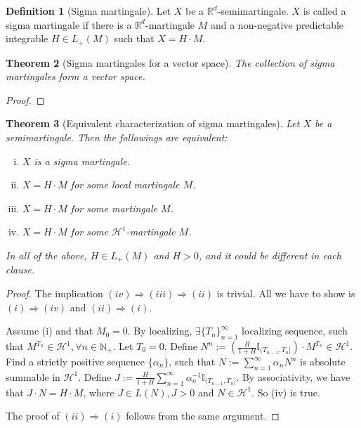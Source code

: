 \documentclass[openany,oneside]{book}
\newtheorem{thm}{Theorem}[section]
\theoremstyle{definition}
\newtheorem{defn}[thm]{Definition}
\theoremstyle{remark}
\newcommand{\I}{\mathbb{I}} %
\begin{document}
\begin{defn}[Sigma martingale]
Let $X$ be a $\mathbb{R}^d$-semimartingale. $X$ is called a sigma martingale if there is a $\mathbb{R}^d$-martingale $M$ and a non-negative predictable integrable $H \in L_+(M)$ such that $X= H\cdot M$. 
\end{defn}

\begin{thm}[Sigma martingales for a vector space]
The collection of sigma martingales form a vector space.
\end{thm}
\begin{proof}

\end{proof}

\begin{thm}[Equivalent characterization of sigma martingales]
Let $X$ be a semimartingale. Then the followings are equivalent:
\begin{enumerate}[(i)]
\item $X$ is a sigma martingale.
\item $X = H\cdot M$ for some local martingale $M$.
\item $X = H\cdot M$ for some martingale $M$.
\item $X = H\cdot M$ for some $\mathcal{H}^1$-martingale $M$.
\end{enumerate}
In all of the above, $H\in L_+(M)$ and $H>0$, and it could be different in each clause.
\end{thm}
\begin{proof}
The implication $(iv) \Rightarrow (iii) \Rightarrow (ii)$ is trivial. All we have to show is $(i) \Rightarrow (iv)$ and $(ii) \Rightarrow (i)$.
\par
Assume (i) and that $M_0 =0$. By localizing, $\exists \{T_n\}_{n=1}^\infty$ localizing sequence, such that $M^{T_n} \in \mathcal{H}^1, \forall n\in \mathbb{N}_+$. Let $T_0 =0$. Define $N^n := \left(\frac{H}{1+H} \I_{(T_{n-1}, T_n]}\right) \cdot M^{T_n} \in \mathcal{H}^1$. Find a strictly positive sequence $\{\alpha_n\}$, such that $N := \sum_{n=1}^\infty \alpha_n N^n$ is absolute summable in $\mathcal{H}^1$. Define $J := \frac{H}{1+H} \sum_{n=1}^\infty \alpha_n^{-1} \I_{(T_{n-1}, T_n]}$. By associativity, we have that $J \cdot N = H \cdot M$, where $J \in L(N), J>0$ and $N\in \mathcal{H}^1$. So (iv) is true.
\par
The proof of $(ii) \Rightarrow (i)$ follows from the same argument.
\end{proof}
\end{document}
